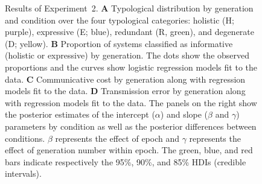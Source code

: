 \documentclass[doc,biblatex]{apa7}
\begin{document}
	\begin{figure}
	\vspace*{2pt}
	\caption{Results of Experiment~2. \textbf{A} Typological distribution by generation and condition over the four typological categories: holistic (H; purple), expressive (E; blue), redundant (R, green), and degenerate (D; yellow). \textbf{B} Proportion of systems classified as informative (holistic or expressive) by generation. The dots show the observed proportions and the curves show logistic regression models fit to the data. \textbf{C} Communicative cost by generation along with regression models fit to the data. \textbf{D} Transmission error by generation along with regression models fit to the data. The panels on the right show the posterior estimates of the intercept ($\alpha$) and slope ($\beta$ and $\gamma$) parameters by condition as well as the posterior differences between conditions. $\beta$ represents the effect of epoch and $\gamma$ represents the effect of generation number within epoch. The green, blue, and red bars indicate respectively the 95\%, 90\%, and 85\% HDIs (credible intervals).}
	\label{results_exp2}
	\end{figure}
\end{document}
